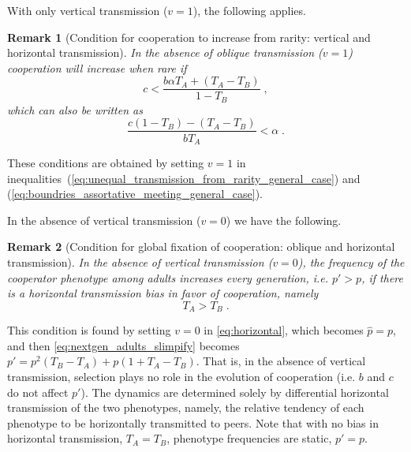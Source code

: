 \documentclass[12pt]{extarticle}
\newtheorem{remark}{Remark}
\begin{document}
With only vertical transmission ($v=1$), the following applies.
\\

\begin{remark}[Condition for cooperation to increase from rarity: vertical and horizontal transmission]
\label{remark:vert_hori}
In the absence of oblique transmission ($v=1$) cooperation will increase when rare if
\begin{equation} \label{eq:vert_hori}
c < \frac{b \alpha T_A + (T_A - T_B)}{1-T_B} \;,
\end{equation} 
which can also be written as
\begin{equation} \label{eq:vert_hori_alpha}
\frac{c (1-T_B)-(T_A-T_B)}{b T_A} < \alpha \;.
\end{equation}
\end{remark}

These conditions are obtained by setting $v=1$ in inequalities~(\ref{eq:unequal_transmission_from_rarity_general_case}) and (\ref{eq:boundries_assortative_meeting_general_case}).

In the absence of vertical transmission ($v=0$) we have the following.
\\

\begin{remark}[Condition for global fixation of cooperation: oblique and horizontal transmission] \label{result:obli_hori}
In the absence of vertical transmission ($v=0$), the frequency of the cooperator phenotype among adults increases every generation, i.e. $p'>p$, if there is a horizontal transmission bias in favor of cooperation, namely
\begin{equation} \label{eq:oblique_only_result}
T_A > T_B \;.
\end{equation}
\end{remark}

This condition is found by setting $v = 0$ in \autoref{eq:horizontal}, which becomes $\hat{p}=p$, and then \autoref{eq:nextgen_adults_slimpify} becomes 
$p' = p^2 (T_B-T_A) + p (1+T_A-T_B)$. 
That is, in the absence of vertical transmission, selection plays no role in the evolution of cooperation (i.e. $b$ and $c$ do not affect $p'$).
The dynamics are determined solely by differential horizontal transmission of the two phenotypes, namely, the relative tendency of each phenotype to be horizontally transmitted to peers.
Note that with no bias in horizontal transmission, $T_A = T_B$, phenotype frequencies are static, $p'=p$.
\end{document}
